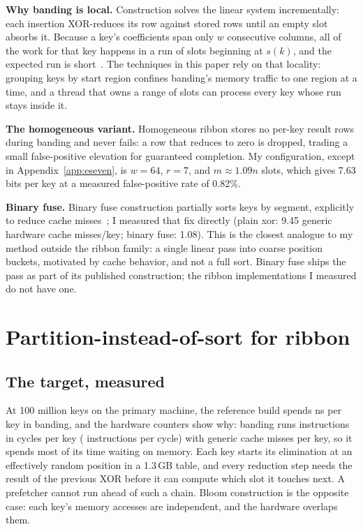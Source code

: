 \documentclass{article}
\begin{document}
\textbf{Why banding is local.} Construction solves the linear system incrementally: each insertion XOR-reduces its row against stored rows until an empty slot absorbs it. Because a key's coefficients span only $w$ consecutive columns, all of the work for that key happens in a run of slots beginning at $s(k)$, and the expected run is short~\citep{dillinger2021ribbon}. The techniques in this paper rely on that locality: grouping keys by start region confines banding's memory traffic to one region at a time, and a thread that owns a range of slots can process every key whose run stays inside it.

\textbf{The homogeneous variant.} Homogeneous ribbon stores no per-key result rows during banding and never fails: a row that reduces to zero is dropped, trading a small false-positive elevation for guaranteed completion. My configuration, except in Appendix~\ref{app:eseven}, is $w = 64$, $r = 7$, and $m \approx 1.09n$ slots, which gives 7.63 bits per key at a measured false-positive rate of 0.82\%.

\textbf{Binary fuse.} Binary fuse construction partially sorts keys by segment, explicitly to reduce cache misses~\citep{graf2022binaryfuse}; I measured that fix directly (plain xor: 9.45 generic hardware cache misses/key; binary fuse: 1.08). This is the closest analogue to my method outside the ribbon family: a single linear pass into coarse position buckets, motivated by cache behavior, and not a full sort. Binary fuse ships the pass as part of its published construction; the ribbon implementations I measured do not have one.

\section{Partition-instead-of-sort for ribbon}\label{sec:ribbon}
\subsection{The target, measured}
At 100 million keys on the primary machine, the reference build spends \esevenbandref{} ns per key
in banding, and the hardware counters show why: banding runs \esevenrefinstr{} instructions in
\esevenrefcycles{} cycles per key (\esevenrefipc{} instructions per cycle) with \esevengenericref{}
generic cache misses per key, so it spends most of its time waiting on memory. Each key starts its elimination at an
effectively random position in a 1.3\,GB table, and every reduction step needs the result of the
previous XOR before it can compute which slot it touches next. A prefetcher cannot run
ahead of such a chain. Bloom construction is the opposite case: each
key's memory accesses are independent, and the hardware overlaps them.
\end{document}
